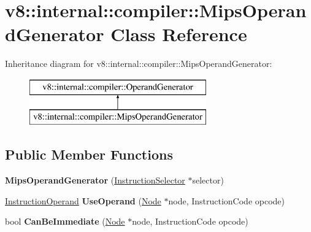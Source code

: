 \hypertarget{classv8_1_1internal_1_1compiler_1_1_mips_operand_generator}{}\section{v8\+:\+:internal\+:\+:compiler\+:\+:Mips\+Operand\+Generator Class Reference}
\label{classv8_1_1internal_1_1compiler_1_1_mips_operand_generator}
Inheritance diagram for v8\+:\+:internal\+:\+:compiler\+:\+:Mips\+Operand\+Generator\+:\begin{figure}[H]
\begin{center}
\leavevmode
\includegraphics[height=2.000000cm]{classv8_1_1internal_1_1compiler_1_1_mips_operand_generator}
\end{center}
\end{figure}
\subsection*{Public Member Functions}
\begin{DoxyCompactItemize}
\item 
{\bfseries Mips\+Operand\+Generator} (\hyperlink{classv8_1_1internal_1_1compiler_1_1_instruction_selector}{Instruction\+Selector} $\ast$selector)\hypertarget{classv8_1_1internal_1_1compiler_1_1_mips_operand_generator_ad184f79a20c7505d080e180c0a8aecba}{}\label{classv8_1_1internal_1_1compiler_1_1_mips_operand_generator_ad184f79a20c7505d080e180c0a8aecba}

\item 
\hyperlink{classv8_1_1internal_1_1compiler_1_1_instruction_operand}{Instruction\+Operand} {\bfseries Use\+Operand} (\hyperlink{classv8_1_1internal_1_1compiler_1_1_node}{Node} $\ast$node, Instruction\+Code opcode)\hypertarget{classv8_1_1internal_1_1compiler_1_1_mips_operand_generator_a3d2e2721e96ca0a5293cc50f01cd1299}{}\label{classv8_1_1internal_1_1compiler_1_1_mips_operand_generator_a3d2e2721e96ca0a5293cc50f01cd1299}

\item 
bool {\bfseries Can\+Be\+Immediate} (\hyperlink{classv8_1_1internal_1_1compiler_1_1_node}{Node} $\ast$node, Instruction\+Code opcode)\hypertarget{classv8_1_1internal_1_1compiler_1_1_mips_operand_generator_a811678cbfc72fb95663519c85e6142c3}{}\label{classv8_1_1internal_1_1compiler_1_1_mips_operand_generator_a811678cbfc72fb95663519c85e6142c3}

\end{DoxyCompactItemize}
